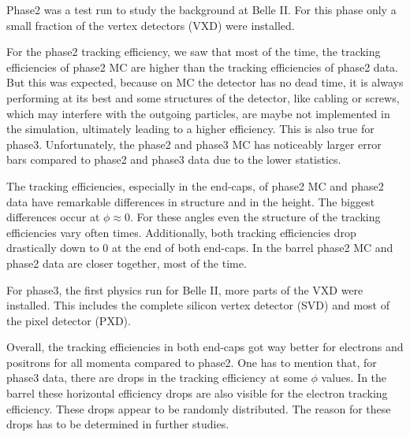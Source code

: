 \documentclass[a4paper,11pt,twosided,final,german,openbib,pdftex,listof=totoc,bibliography=totoc]{scrbook}
\begin{document}
Phase2 was a test run to study the background at Belle II. For this phase only a small fraction of the vertex detectors (VXD) were installed.

For the phase2 tracking efficiency, we saw that most of the time, the tracking efficiencies of phase2 MC are higher than the tracking efficiencies of phase2 data. But this was expected, because on MC the detector has no dead time, it is always performing at its best and some structures of the detector, like cabling or screws, which may interfere with the outgoing particles, are maybe not implemented in the simulation, ultimately leading to a higher efficiency. This is also true for phase3. Unfortunately, the phase2 and phase3 MC has noticeably larger error bars compared to phase2 and phase3 data due to the lower statistics.
\newline

The tracking efficiencies, especially in the end-caps, of phase2 MC and phase2 data have remarkable differences in structure and in the height. The biggest differences occur at $\phi \approx 0$. For these angles even the structure of the tracking efficiencies vary often times. Additionally, both tracking efficiencies drop drastically down to 0 at the end of both end-caps. In the barrel phase2 MC and phase2 data are closer together, most of the time.
\newline

For phase3, the first physics run for Belle II, more parts of the VXD were installed. This includes the complete silicon vertex detector (SVD) and most of the pixel detector (PXD). 

Overall, the tracking efficiencies in both end-caps got way better for electrons and positrons for all momenta compared to phase2. One has to mention that, for phase3 data, there are drops in the tracking efficiency at some $\phi$ values.
In the barrel these horizontal efficiency drops are also visible for the electron tracking efficiency.
These drops appear to be randomly distributed. The reason for these drops has to be determined in further studies.

 
 
\end{document}
